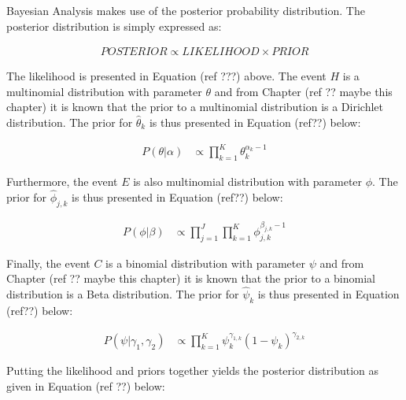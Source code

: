Bayesian Analysis makes use of the posterior probability distribution. The posterior distribution is simply expressed as:

\begin{equation*}
    \begin{split}
        POSTERIOR \propto LIKELIHOOD \times PRIOR
    \end{split}
\end{equation*}

The likelihood is presented in Equation (ref ???) above. The event $H$ is a multinomial distribution with parameter $\theta$ and from Chapter (ref ?? maybe this chapter) it is known that the prior to a multinomial distribution is a Dirichlet distribution. The prior for $\hat{\theta}_{k}$ is thus presented in Equation (ref??) below:

\begin{equation}
    \begin{split}
        P(\theta | \alpha)
&\propto \prod_{k=1}^{K} \theta_{k}^{\alpha_{k} -1}
    \end{split}
\end{equation}

Furthermore, the event $E$ is also multinomial distribution with parameter $\phi$. The prior for $\hat{\phi}_{j,k}$ is thus presented in Equation (ref??) below:

\begin{equation}
    \begin{split}
        P(\phi | \beta)
&\propto \prod_{j=1}^{J}  \prod_{k=1}^{K} \phi_{j,k}^{\beta_{j,k} -1}
    \end{split}
\end{equation}

Finally,  the event $C$ is a binomial distribution with parameter $\psi$ and from Chapter (ref ?? maybe this chapter) it is known that the prior to a binomial distribution is a Beta distribution. The prior for $\hat{\psi}_{k}$ is thus presented in Equation (ref??) below:

\begin{equation}
    \begin{split}
        P(\psi | \gamma_{1}, \gamma_{2})
&\propto \prod_{k=1}^{K} \psi_{k}^{\gamma_{1,k}} (1- \psi_{k})^{\gamma_{2,k}}
    \end{split}
\end{equation}

Putting the likelihood and priors together yields the posterior distribution as given in Equation (ref ??) below:

